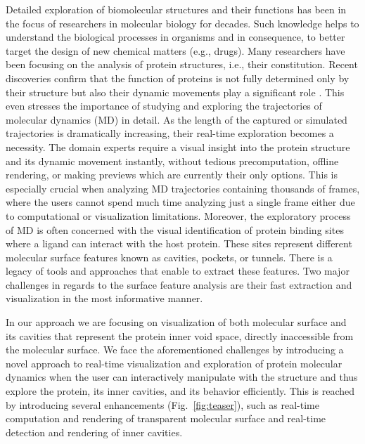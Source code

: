 
Detailed exploration of biomolecular structures and their functions has been in the focus of researchers in molecular biology for decades.
Such knowledge helps to understand the biological processes in organisms and in consequence, to better target the design of new chemical matters (e.g., drugs).
Many researchers have been focusing on the analysis of protein structures, i.e., their constitution. 
Recent discoveries confirm that the function of proteins is not fully determined only by their structure but also their dynamic movements play a significant role \cite{Hensen2012}.
This even stresses the importance of studying and exploring the trajectories of molecular dynamics (MD) in detail. 
As the length of the captured or simulated trajectories is dramatically increasing, their real-time exploration becomes a necessity.
The domain experts require a visual insight into the protein structure and its dynamic movement instantly, without tedious precomputation, offline rendering, or making previews which are currently their only options.
This is especially crucial when analyzing MD trajectories containing thousands of frames, where the users cannot spend much time analyzing just a single frame either due to computational or visualization limitations. 
Moreover, the exploratory process of MD is often concerned with the visual identification of protein binding sites where a ligand can interact with the host protein.
These sites represent different molecular surface features known as cavities, pockets, or tunnels.
There is a legacy of tools and approaches that enable to extract these features.
Two major challenges in regards to the surface feature analysis are their fast extraction and visualization in the most informative manner. 

In our approach we are focusing on visualization of both molecular surface and its cavities that represent the protein inner void space, directly inaccessible from the molecular surface. 
We face the aforementioned challenges by introducing a novel approach to real-time visualization and exploration of protein molecular dynamics when the user can interactively manipulate with the structure and thus explore the protein, its inner cavities, and its behavior efficiently. 
This is reached by introducing several enhancements (Fig.~\ref{fig:teaser}), such as real-time computation and rendering of transparent molecular surface and real-time detection and rendering of inner cavities.

